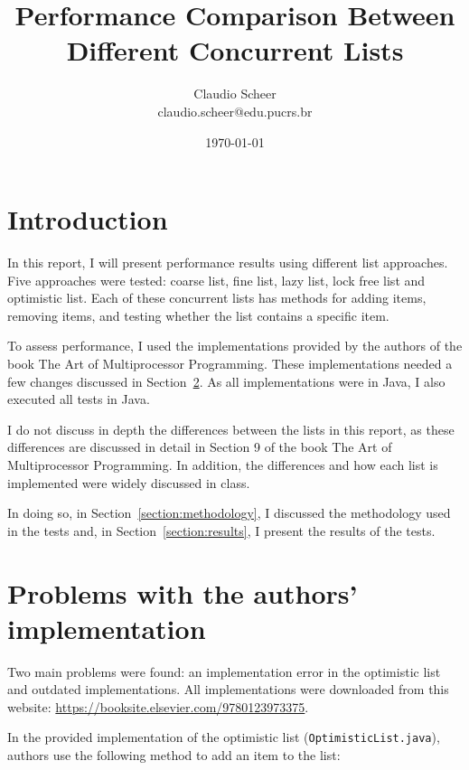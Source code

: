 \documentclass{article}
\title{Performance Comparison Between Different Concurrent Lists}
\author{
    Claudio Scheer\\
    claudio.scheer@edu.pucrs.br
}
\date{\today}
\begin{document}
\maketitle

\section{Introduction}

In this report, I will present performance results using different list approaches. Five approaches were tested: coarse list, fine list, lazy list, lock free list and optimistic list. Each of these concurrent lists has methods for adding items, removing items, and testing whether the list contains a specific item.

To assess performance, I used the implementations provided by the authors of the book The Art of Multiprocessor Programming. These implementations needed a few changes discussed in Section~\ref{section:list_problems}. As all implementations were in Java, I also executed all tests in Java.

I do not discuss in depth the differences between the lists in this report, as these differences are discussed in detail in Section 9 of the book The Art of Multiprocessor Programming. In addition, the differences and how each list is implemented were widely discussed in class.

In doing so, in Section~\ref{section:methodology}, I discussed the methodology used in the tests and, in Section~\ref{section:results}, I present the results of the tests.


\section{Problems with the authors' implementation} \label{section:list_problems}

Two main problems were found: an implementation error in the optimistic list and outdated implementations. All implementations were downloaded from this website: \url{https://booksite.elsevier.com/9780123973375}.

In the provided implementation of the optimistic list (\texttt{OptimisticList.java}), authors use the following method to add an item to the list:
\end{document}
